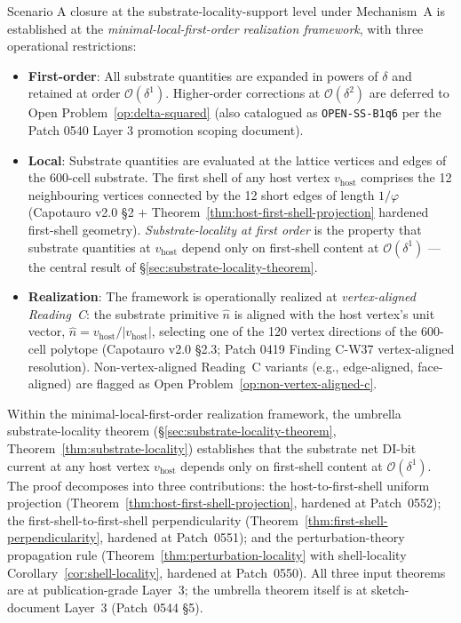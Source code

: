 \documentclass[11pt,letterpaper]{article}
\newcommand{\phig}{\varphi}
\newcommand{\vhost}{v_{\text{host}}}
\newcommand{\bigO}[1]{\mathcal{O}(#1)}
\begin{document}
Scenario A closure at the substrate-locality-support level under Mechanism~A is established at the \emph{minimal-local-first-order realization framework}, with three operational restrictions:

\begin{itemize}[leftmargin=2em]
\item \textbf{First-order}: All substrate quantities are expanded in powers of $\delta$ and retained at order $\bigO{\delta^1}$. Higher-order corrections at $\bigO{\delta^2}$ are deferred to Open Problem~\ref{op:delta-squared} (also catalogued as \texttt{OPEN-SS-B1q6} per the Patch 0540 Layer 3 promotion scoping document).
\item \textbf{Local}: Substrate quantities are evaluated at the lattice vertices and edges of the 600-cell substrate. The first shell of any host vertex $\vhost$ comprises the 12 neighbouring vertices connected by the 12 short edges of length $1/\phig$ (Capotauro v2.0 \S2 + Theorem~\ref{thm:host-first-shell-projection} hardened first-shell geometry). \emph{Substrate-locality at first order} is the property that substrate quantities at $\vhost$ depend only on first-shell content at $\bigO{\delta^1}$ --- the central result of \S\ref{sec:substrate-locality-theorem}.
\item \textbf{Realization}: The framework is operationally realized at \emph{vertex-aligned Reading~C}: the substrate primitive $\hat{n}$ is aligned with the host vertex's unit vector, $\hat{n} = \vhost / |\vhost|$, selecting one of the 120 vertex directions of the 600-cell polytope (Capotauro v2.0 \S2.3; Patch 0419 Finding C-W37 vertex-aligned resolution). Non-vertex-aligned Reading~C variants (e.g., edge-aligned, face-aligned) are flagged as Open Problem~\ref{op:non-vertex-aligned-c}.
\end{itemize}

Within the minimal-local-first-order realization framework, the umbrella substrate-locality theorem (\S\ref{sec:substrate-locality-theorem}, Theorem~\ref{thm:substrate-locality}) establishes that the substrate net DI-bit current at any host vertex $\vhost$ depends only on first-shell content at $\bigO{\delta^1}$. The proof decomposes into three contributions: the host-to-first-shell uniform projection (Theorem~\ref{thm:host-first-shell-projection}, hardened at Patch~0552); the first-shell-to-first-shell perpendicularity (Theorem~\ref{thm:first-shell-perpendicularity}, hardened at Patch~0551); and the perturbation-theory propagation rule (Theorem~\ref{thm:perturbation-locality} with shell-locality Corollary~\ref{cor:shell-locality}, hardened at Patch~0550). All three input theorems are at publication-grade Layer~3; the umbrella theorem itself is at sketch-document Layer~3 (Patch~0544 \S5).
\end{document}
